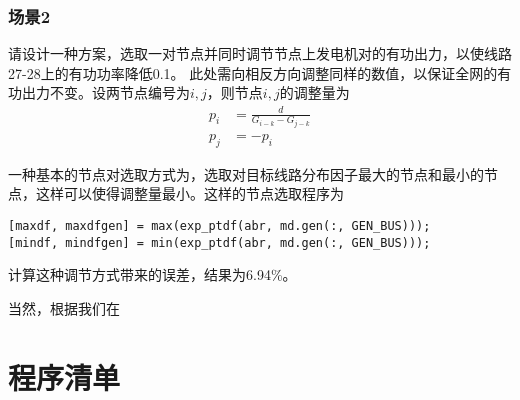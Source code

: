\documentclass[a4paper,12pt]{article}
\begin{document}
    \subsubsection{场景2} 请设计一种方案，选取一对节点并同时调节节点上发电机对的有功出力，以使线路27-28上的有功功率降低0.1。
    此处需向相反方向调整同样的数值，以保证全网的有功出力不变。设两节点编号为$i,j$，则节点$i,j$的调整量为
    \begin{equation}
      \label{eq:q3ij}
      \begin{aligned}
        p_i &= \frac{d}{G_{i-k} - G_{j-k}}\\
        p_j &= - p_i
      \end{aligned}
    \end{equation}

    一种基本的节点对选取方式为，选取对目标线路分布因子最大的节点和最小的节点，这样可以使得调整量最小。这样的节点选取程序为
    \begin{lstlisting}[style=Matlab-editor,basicstyle=\mlttfamily]
[maxdf, maxdfgen] = max(exp_ptdf(abr, md.gen(:, GEN_BUS)));
[mindf, mindfgen] = min(exp_ptdf(abr, md.gen(:, GEN_BUS)));
    \end{lstlisting}
    计算这种调节方式带来的误差，结果为6.94\%。

    当然，根据我们在

    
    
    \appendix
    \section{程序清单}
      
      
      
      
      
      
    \label{applastpage}
\iffalse
\begin{itemize}[noitemsep,topsep=0pt]
\end{itemize}
\begin{enumerate}[label=\Roman{*}.,noitemsep,topsep=0pt]
\end{enumerate}
\begin{multicols}{2}
\end{multicols}
\begin{lstlisting}[style=Matlab-editor,basicstyle=\mlttfamily]

\end{lstlisting}
\fi
\end{document}
